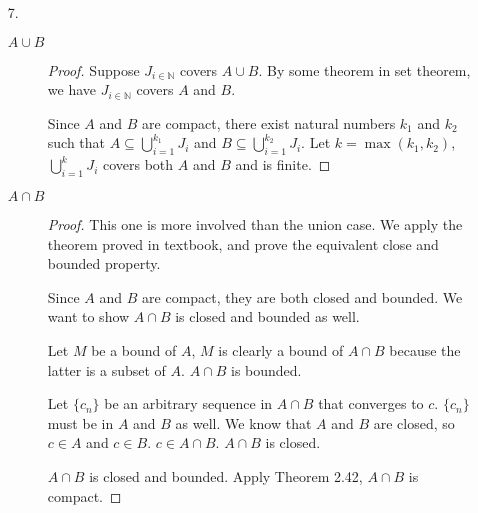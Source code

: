 \documentclass{article}
\begin{document}
\begin{enumerate}
\begin{proof}
    Let $A_{i\in \mathbb{N}}$ be a family of sets such that
    $\{a\} \subseteq \bigcup_{i=1}^{\infty}A_i$. Therefore,
    $a \in \bigcup_{i=1}^{\infty}A_i$. By definition of the infinite
    union, $a \in A_k$ for some $k \in \mathbb{N}$. It is obvious that
    $x \in A_k \subseteq \bigcup_{i=1}^{k}A_i$. We have found a finite
    subcover.
  \end{proof}
\item [7.]
  \begin{description}
  \item[$A \cup B$]
    \begin{proof}
      Suppose $J_{i \in \mathbb{N}}$ covers $A \cup B$. By some
      theorem in set theorem, we have $J_{i \in \mathbb{N}}$ covers
      $A$ and $B$.

      Since $A$ and $B$ are compact, there exist natural numbers $k_1$
      and $k_2$ such that $A \subseteq \bigcup_{i=1}^{k_1}J_i$ and $B
      \subseteq \bigcup_{i=1}^{k_2}J_i$. Let $k=\max(k_1,k_2)$,
      $\bigcup_{i=1}^{k}J_i$ covers both $A$ and $B$ and is finite.
    \end{proof}
  \item[$A \cap B$]
    \begin{proof}
      This one is more involved than the union case. We apply the
      theorem proved in textbook, and prove the equivalent close and
      bounded property.

      Since $A$ and $B$ are compact, they are both closed and
      bounded. We want to show $A \cap B$ is closed and bounded as
      well.

      Let $M$ be a bound of $A$, $M$ is clearly a bound of $A \cap
      B$ because the latter is a subset of $A$. $A \cap B$ is bounded.

      Let $\{c_n\}$ be an arbitrary sequence in $A \cap B$ that
      converges to $c$. $\{c_n\}$ must be in $A$ and $B$ as well. We
      know that $A$ and $B$ are closed, so $c \in A$  and $c \in
      B$. $c \in A \cap B$. $A \cap B$ is closed.

      $A \cap B$ is closed and bounded. Apply Theorem 2.42, $A \cap B$
      is compact. 
    \end{proof}
  \end{description}
  

\end{enumerate}
\end{document}
